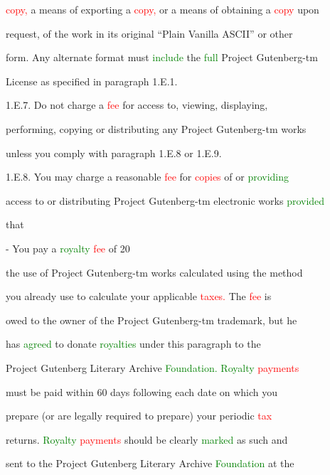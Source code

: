  \textcolor{red}{copy,} a means of exporting a \textcolor{red}{copy,} or a means of obtaining a \textcolor{red}{copy} upon

 request, of the work in its original “Plain Vanilla ASCII” or other

 form. Any alternate format must \textcolor{green}{include} the \textcolor{green}{full} Project Gutenberg-tm

 License as specified in paragraph 1.E.1.



 1.E.7. Do not charge a \textcolor{red}{fee} for access to, viewing, displaying,

 performing, copying or distributing any Project Gutenberg-tm works

 unless you comply with paragraph 1.E.8 or 1.E.9.



 1.E.8. You may charge a reasonable \textcolor{red}{fee} for \textcolor{red}{copies} of or \textcolor{green}{providing}

 access to or distributing Project Gutenberg-tm electronic works \textcolor{green}{provided}

 that



 - You \textcolor{BurntOrange}{pay} a \textcolor{green}{royalty} \textcolor{red}{fee} of 20%

 the use of Project Gutenberg-tm works calculated using the method

 you already use to calculate your applicable \textcolor{red}{taxes.} The \textcolor{red}{fee} is

 owed to the owner of the Project Gutenberg-tm trademark, but he

 has \textcolor{green}{agreed} to donate \textcolor{green}{royalties} under this paragraph to the

 Project Gutenberg Literary Archive \textcolor{green}{Foundation.} \textcolor{green}{Royalty} \textcolor{red}{payments}

 must be paid within 60 days following each date on which you

 \textcolor{BurntOrange}{prepare} (or are legally required to \textcolor{BurntOrange}{prepare)} your periodic \textcolor{red}{tax}

 returns. \textcolor{green}{Royalty} \textcolor{red}{payments} should be clearly \textcolor{green}{marked} as such and

 sent to the Project Gutenberg Literary Archive \textcolor{green}{Foundation} at the

